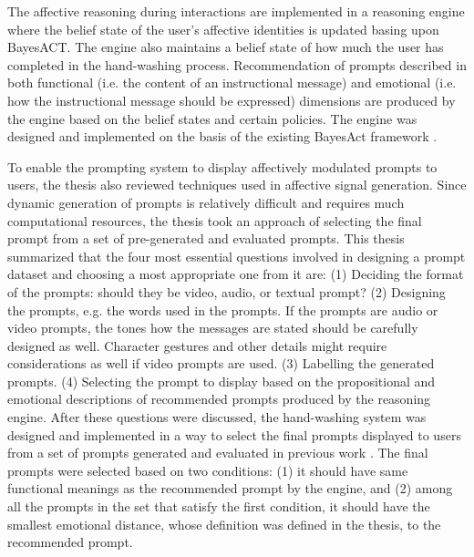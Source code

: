 The affective reasoning during interactions are implemented in a reasoning engine where the belief state of the user's affective identities is updated basing upon BayesACT. The engine also maintains a belief state of how much the user has completed in the hand-washing process. Recommendation of prompts described in both functional (i.e. the content of an instructional message) and emotional (i.e. how the instructional message should be expressed) dimensions are produced by the engine based on the belief states and certain policies. The engine was designed and implemented on the basis of the existing BayesAct framework \cite{hoey2013bayesian}.

To enable the prompting system to display affectively modulated prompts to users, the thesis also reviewed techniques used in affective signal generation. Since dynamic generation of prompts is relatively difficult and requires much computational resources, the thesis took an approach of selecting the final prompt from a set of pre-generated and evaluated prompts. This thesis summarized that the four most essential questions involved in designing a prompt dataset and choosing a most appropriate one from it are: (1) Deciding the format of the prompts: should they be video, audio, or textual prompt? (2) Designing the prompts, e.g. the words used in the prompts. If the prompts are audio or video prompts, the tones how the messages are stated should be carefully designed as well. Character gestures and other details might require considerations as well if video prompts are used. (3) Labelling the generated prompts. (4) Selecting the prompt to display based on the propositional and emotional descriptions of recommended prompts produced by the reasoning engine. After these questions were discussed, the hand-washing system was designed and implemented in a way to select the final prompts displayed to users from a set of prompts generated and evaluated in previous work \cite{malhotra2014}. The final prompts were selected based on two conditions: (1) it should have same functional meanings as the recommended prompt by the engine, and (2) among all the prompts in the set that satisfy the first condition, it should have the smallest emotional distance, whose definition was defined in the thesis, to the recommended prompt.

